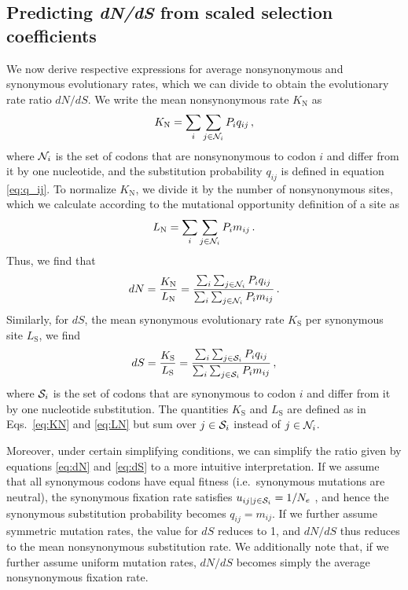 \documentclass[11pt]{article}
\begin{document}
		
\subsection*{Predicting \emph{dN/dS} from scaled selection coefficients} 

We now derive respective expressions for average nonsynonymous and synonymous evolutionary rates, which we can divide to obtain the evolutionary rate ratio $dN/dS$. We write the mean nonsynonymous rate $K_\text{N}$ as 
\begin{equation}\label{eq:KN}
	K_\text{N} = \sum_i \sum_{j \in {\cal N}_i} P_i q_{ij} \,,
\end{equation}
where ${\cal N}_i$ is the set of codons that are nonsynonymous to codon $i$ and differ from it by one nucleotide, and the substitution probability $q_{ij}$ is defined in equation \eqref{eq:q_ij}. To normalize $K_\text{N}$, we divide it by the number of nonsynonymous sites, which we calculate according to the mutational opportunity definition of a site \citep{GoldmanYang1994, Yang2006} as 
\begin{equation}\label{eq:LN}
	L_\text{N} = \sum_i \sum_{j \in {\cal N}_i} P_i m_{ij}\, .
\end{equation} Thus, we find that 
\begin{equation}\label{eq:dN}
	dN = \frac{K_\text{N}}{L_\text{N}}=\frac{\sum_i \sum_{j \in {\cal N}_i} P_i q_{ij}} {\sum_i \sum_{j \in {\cal N}_i}P_i m_{ij}}\,.
\end{equation} Similarly, for $dS$, the mean synonymous evolutionary rate $K_\text{S}$ per synonymous site $L_\text{S}$, we find
\begin{equation}\label{eq:dS}
	dS = \frac{K_\text{S}}{L_\text{S}}=\frac{\sum_i \sum_{j \in {\cal S}_i} P_i q_{ij} } {\sum_i \sum_{j \in {\cal S}_i} P_i m_{ij} }\,,
\end{equation}
where ${\cal S}_i$ is the set of codons that are synonymous to codon $i$ and differ from it by one nucleotide substitution. The quantities $K_\text{S}$ and $L_\text{S}$ are defined as in Eqs.~\eqref{eq:KN} and \eqref{eq:LN} but sum over $j\in {\cal S}_i$ instead of $j\in {\cal N}_i$. 

Moreover, under certain simplifying conditions, we can simplify the ratio given by equations \eqref{eq:dN} and \eqref{eq:dS} to a more intuitive interpretation. If we assume that all synonymous codons have equal fitness (i.e.\ synonymous mutations are neutral), the synonymous fixation rate satisfies $u_{ij | j \in {\cal S}_i} = 1/N_e$ \citep{CrowKimura1970}, and hence the synonymous substitution probability becomes $q_{ij} = m_{ij}$. If we further assume symmetric mutation rates, the value for $dS$ reduces to 1, and $dN/dS$ thus reduces to the mean nonsynonymous substitution rate. We additionally note that, if we further assume uniform mutation rates, $dN/dS$ becomes simply the average nonsynonymous fixation rate.
\end{document}
